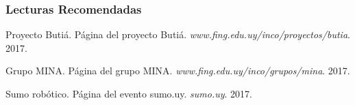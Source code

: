 \documentclass[spanish]{beamer}
\begin{document}
\begin{frame}
\frametitle{Lecturas Recomendadas}
\footnotesize{

\begin{thebibliography}{99} %
 Proyecto Butiá.
\newblock Página del proyecto Butiá.
\newblock\emph{www.fing.edu.uy/inco/proyectos/butia}. 2017.

 Grupo MINA.
\newblock Página del grupo MINA.
\newblock\emph{www.fing.edu.uy/inco/grupos/mina}. 2017.

 Sumo robótico.
\newblock Página del evento sumo.uy.
\newblock\emph{sumo.uy}. 2017.

\end{thebibliography}
}
\end{frame}

\end{document}
